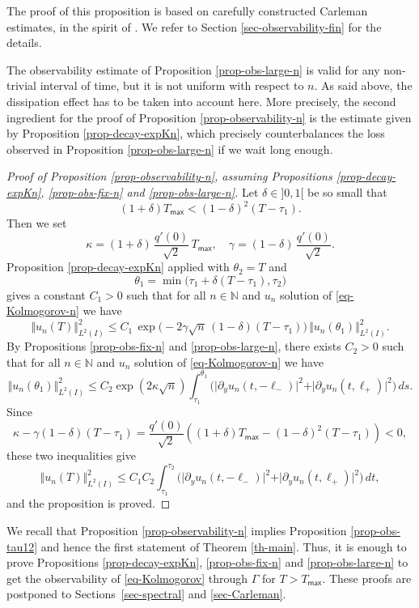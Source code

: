 \documentclass[11pt]{article}
\numberwithin{equation}{section}
\theoremstyle{plain}
\theoremstyle{definition}
\newcommand{\1}{\mathds 1}
\newcommand{\N}{\mathbb{N}}
\let\G\Gamma
\let\th\theta
\newcommand{\Tmax}{T_{\mathsf{max}}}
\begin{document}
The proof of this proposition is based on carefully constructed Carleman estimates, in the spirit of \cite{Beauchard_Darde_Ervedoza}. We refer to Section \ref{sec-observability-fin} for the details.

The observability estimate of Proposition \ref{prop-obs-large-n} is valid for any non-trivial interval of time, but it is not uniform with respect to $n$. As said above, the dissipation effect has to be taken into account here. More precisely, the second ingredient for the proof of Proposition \ref{prop-observability-n} is the estimate given by Proposition \ref{prop-decay-expKn}, which precisely counterbalances the loss observed in Proposition \ref{prop-obs-large-n} if we wait long enough.

\begin{proof}[Proof of Proposition \ref{prop-observability-n}, assuming Propositions \ref{prop-decay-expKn}, \ref{prop-obs-fix-n} and \ref{prop-obs-large-n}]
Let $\delta \in{}]0,1[$ be so small that
\[
(1 +\delta) \Tmax < (1-\delta)^2 (T - \tau_1).
\]
Then we set
\[
\kappa = (1+\delta)\, \frac{q'(0)}{\sqrt{2}}\, \Tmax,
\quad \gamma = (1-\delta)\, \frac{q'(0)}{\sqrt{2}}.
\]
Proposition \ref{prop-decay-expKn} applied with $\th_2 = T$ and
\[
\th_1 = \min\bigl(\tau_1 + \delta (T-\tau_1) , \tau_2 \bigr)
\]
gives a constant $C_1 > 0$ such that for all $n\in \N$ and $u_n$ solution of \eqref{eq-Kolmogorov-n} we have
\[
\Vert u_n (T) \Vert_{L^2(I)}^2 \leq C_1 \, \exp \bigl(-2\gamma \sqrt n\,(1-\delta) (T-\tau_1) \bigr)\, \Vert u_n(\th_1) \Vert_{L^2(I)}^2.
\]
By Propositions \ref{prop-obs-fix-n} and \ref{prop-obs-large-n}, there exists $C_2 > 0$ such that for all $n\in \N$ and $u_n$ solution of \eqref{eq-Kolmogorov-n} we have
\[
\Vert u_n(\th_1) \Vert_{L^2(I)}^2 \leq C_2 \exp(2\kappa \sqrt{n}) {\int_{\tau_1}^{\theta_1}
\bigl(\vert \partial_y u_n(t,-\ell_-)\vert^2 + \vert \partial_y u_n(t,\ell_+) \vert^2 \bigr)\, ds }.
\]
Since
\[
\kappa - \gamma (1-\delta)(T-\tau_1) = \frac{q'(0)}{\sqrt{2}} \left((1+\delta) \Tmax - (1-\delta)^2 (T-\tau_1) \right)< 0,
\]
these two inequalities give
\[
\Vert u_n(T) \Vert_{L^2(I)}^2 \leq C_1C_2 {\int_{\tau_1}^{\tau_2} \bigl(\vert \partial_y u_n(t,-\ell_-)\vert^2 + \vert \partial_y u_n(t,\ell_+) \vert^2 \bigr) \, dt },
\]
and the proposition is proved.
\end{proof}

We recall that Proposition \ref{prop-observability-n} implies Proposition \ref{prop-obs-tau12} and hence the first statement of Theorem \ref{th-main}. Thus, it is enough to prove Propositions \ref{prop-decay-expKn}, \ref{prop-obs-fix-n} and \ref{prop-obs-large-n} to get the observability of \eqref{eq-Kolmogorov} through $\G$ for $T > \Tmax$. These proofs are postponed to Sections~\ref{sec-spectral} and \ref{sec-Carleman}.
\end{document}
